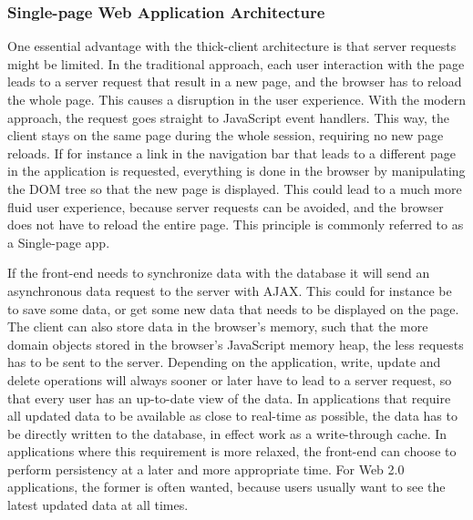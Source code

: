 \subsubsection{Single-page Web Application Architecture}
One essential advantage with the thick-client architecture is that server requests might be limited. In the traditional approach, each user interaction with the page leads to a server request that result in a new page, and the browser has to reload the whole page. This causes a disruption in the user experience. With the modern approach, the request goes straight to JavaScript event handlers. This way, the client stays on the same page during the whole session, requiring no new page reloads. If for instance a link in the navigation bar that leads to a different page in the application is requested, everything is done in the browser by manipulating the DOM tree so that the new page is displayed. This could lead to a much more fluid user experience, because server requests can be avoided, and the browser does not have to reload the entire page. This principle is commonly referred to as a Single-page app\cite{spa-man}.

If the front-end needs to synchronize data with the database it will send an asynchronous data request to the server with AJAX. This could for instance be to save some data, or get some new data that needs to be displayed on the page. The client can also store data in the browser's memory, such that the more domain objects stored in the browser's JavaScript memory heap, the less requests has to be sent to the server. Depending on the application, write, update and delete operations will always sooner or later have to lead to a server request, so that every user has an up-to-date view of the data. In applications that require all updated data to be available as close to real-time as possible, the data has to be directly written to the database, in effect work as a write-through cache. In applications where this requirement is more relaxed, the front-end can choose to perform persistency at a later and more appropriate time. For Web 2.0 applications, the former is often wanted, because users usually want to see the latest updated data at all times. 
		
